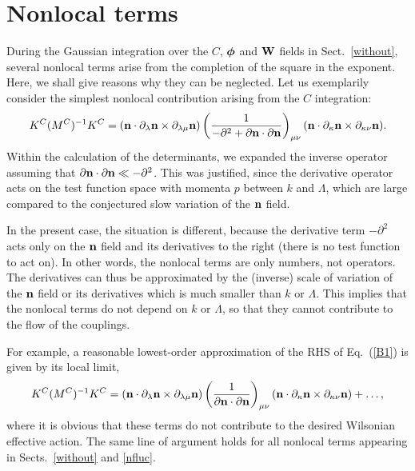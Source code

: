 \documentclass[a4paper,12pt]{article}
\newcommand{\re}[1]{~(\ref{#1})}
\begin{document}
\section{Nonlocal terms}
During the Gaussian integration over the $C$, $\boldsymbol{\phi}$ and $\mathbf{W}$ fields
in Sect.~\ref{without}, several nonlocal terms arise from the
completion of the square in the exponent. Here, we shall give reasons
why they can be neglected. Let us exemplarily consider the simplest
nonlocal contribution arising from the $C$ integration:
\begin{equation}
K^C (M^C)^{-1} K^C= (\mathbf{n} \cdot \partial_\lambda\mathbf{n}\times
\partial_{\lambda\mu} \mathbf{n}) \left(\frac{1}{-\partial^2
    +\partial\mathbf{n}\cdot \partial\mathbf{n}} \right)_{\mu\nu} (\mathbf{n}\cdot
\partial_\kappa\mathbf{n}\times \partial_{\kappa\nu} \mathbf{n}). \label{B1}
\end{equation}
Within the calculation of the determinants, we expanded the inverse
operator assuming that $\partial\mathbf{n}\cdot \partial\mathbf{n}\ll
-\partial^2$. This was justified, since the derivative operator acts
on the test function space with momenta $p$ between $k$ and $\Lambda$,
which are large compared to the conjectured slow variation of the
$\mathbf{n}$ field. 

In the present case, the situation is different, because the
derivative term $-\partial^2$ acts only on the $\mathbf{n}$ field and its
derivatives to the right (there is no test function to act on). In
other words, the nonlocal terms are only numbers, not operators. The
derivatives can thus be approximated by the (inverse) scale of
variation of the $\mathbf{n}$ field or its derivatives which is much smaller
than $k$ or $\Lambda$. This implies that the nonlocal terms do not
depend on $k$ or $\Lambda$, so that they cannot contribute to the flow
of the couplings. 

For example, a reasonable lowest-order approximation of the RHS of
Eq.\re{B1} is given by its local limit,
\begin{equation}
K^C (M^C)^{-1} K^C= (\mathbf{n} \cdot \partial_\lambda\mathbf{n}\times
\partial_{\lambda\mu} \mathbf{n}) \left(\frac{1}{
    \partial\mathbf{n}\cdot \partial\mathbf{n}} \right)_{\mu\nu} (\mathbf{n}\cdot
\partial_\kappa\mathbf{n}\times \partial_{\kappa\nu} \mathbf{n})+\dots, \label{B2}
\end{equation}
where it is obvious that these terms do not contribute to the desired
Wilsonian effective action. The same line of argument holds for all
nonlocal terms appearing in Sects.~\ref{without} and \ref{nfluc}.
\end{document}
